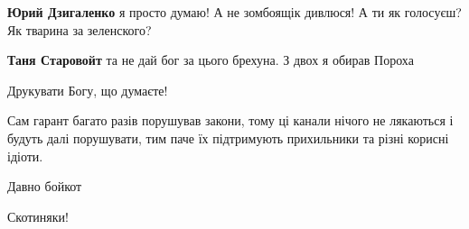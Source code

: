 \begin{itemize}
\begin{itemize}
 
\textbf{Юрий Дзигаленко} я просто думаю! А не зомбоящік дивлюся! А ти як голосуєш? Як тварина за зеленского?

 
\textbf{Таня Старовойт} та не дай бог за цього брехуна. З двох я обирав Пороха

 
Друкувати Богу, що думаєте!
\end{itemize}

 

Сам гарант багато разів порушував закони, тому ці канали нічого не лякаються і
будуть далі порушувати, тим паче їх підтримують прихильники та різні корисні
ідіоти.


 
Давно бойкот

 
Скотиняки!

 

\end{itemize}
